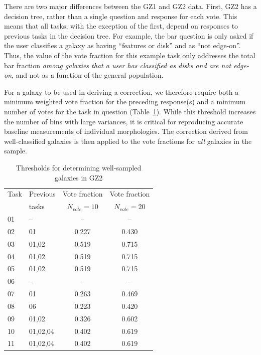 \documentclass[useAMS,usenatbib]{mn2e}
\begin{document}
There are two major differences between the GZ1 and GZ2 data. First, GZ2 has a decision tree, rather than a single question and response for each vote. This means that all tasks, with the exception of the first, depend on responses to previous tasks in the decision tree. For example, the bar question is only asked if the user classifies a galaxy as having ``features or disk'' and as ``not edge-on''. Thus, the value of the vote fraction for this example task only addresses the total bar fraction {\em among galaxies that a user has classified as disks and are not edge-on}, and not as a function of the general population. 

For a galaxy to be used in deriving a correction, we therefore require both a minimum weighted vote fraction for the preceding response(s) and a minimum number of votes for the task in question (Table~\ref{tbl-thresholds}). While this threshold increases the number of bins with large variances, it is critical for reproducing accurate baseline measurements of individual morphologies. The correction derived from well-classified galaxies is then applied to the vote fractions for {\em all} galaxies in the sample. 

\begin{table}
\centering
 \begin{tabular}{@{}llcc}
 \hline
\multicolumn{1}{l}{Task} &
\multicolumn{1}{l}{Previous} &
\multicolumn{1}{c}{Vote fraction} &
\multicolumn{1}{c}{Vote fraction}
\\ 
\multicolumn{1}{l}{} &
\multicolumn{1}{l}{tasks} &
\multicolumn{1}{c}{$N_{vote}=10$} &
\multicolumn{1}{c}{$N_{vote}=20$}
\\ 
\hline					
01                      & --        & --        & --        \\
02                      & 01        & 0.227     & 0.430     \\
03                      & 01,02     & 0.519     & 0.715     \\
04                      & 01,02     & 0.519     & 0.715     \\
05                      & 01,02     & 0.519     & 0.715     \\
06                      & --        & --        & --        \\
07                      & 01        & 0.263     & 0.469     \\
08                      & 06        & 0.223     & 0.420     \\
09                      & 01,02     & 0.326     & 0.602     \\
10                      & 01,02,04  & 0.402     & 0.619     \\
11                      & 01,02,04  & 0.402     & 0.619     \\
\hline
 \end{tabular}
 \caption{Thresholds for determining well-sampled galaxies in GZ2 \label{tbl-thresholds}}
\end{table}
\end{document}
